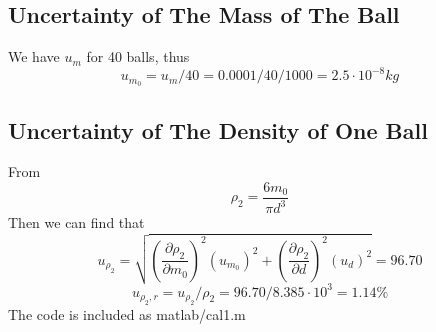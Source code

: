 \subsection{Uncertainty of The Mass of The Ball}
We have $u_m $ for 40 balls, thus
$$   u_{m_0} = u_m /40 = 0.0001 / 40 / 1000 = 2.5 \cdot 10^{-8} kg  $$

\subsection{Uncertainty of The Density of One Ball}
From
$$   \rho_2 = \frac{6m_0}{ \pi d^3 } $$
Then we can find that
$$ u_{\rho_2} = \sqrt{(\frac{\partial \rho_2}{\partial m_0})^2(u_{m_0})^2 +
  (\frac{\partial \rho_2}{\partial d})^2(u_d)^2 
} = 96.70  $$ 
$$   u_{\rho_2,r} = u_{\rho_2 } / \rho_2  =  96.70 / 8.385 \cdot 10^3 =   1.14 \% $$ 
The code is included as matlab/cal1.m 





